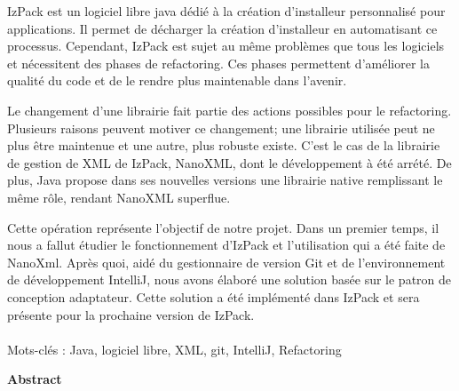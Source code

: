 IzPack est un logiciel libre java dédié à la création d'installeur personnalisé pour applications.
Il permet de décharger la création d'installeur en automatisant ce processus.
Cependant, IzPack est sujet au même problèmes que tous les logiciels et nécessitent des phases de refactoring.
Ces phases permettent d'améliorer la qualité du code et de le rendre plus maintenable dans l'avenir.

Le changement d'une librairie fait partie des actions possibles pour le refactoring.
Plusieurs raisons peuvent motiver ce changement; une librairie utilisée peut ne plus être maintenue et une autre, plus robuste existe.
C'est le cas de la librairie de gestion de XML de IzPack, NanoXML, dont le développement à été arrété. 
De plus, Java propose dans ses nouvelles versions une librairie native remplissant le même rôle, rendant NanoXML superflue.

Cette opération représente l'objectif de notre projet. 
Dans un premier temps, il nous a fallut étudier le fonctionnement d'IzPack et l'utilisation qui a été faite de NanoXml.
Après quoi, aidé du gestionnaire de version Git et de l'environnement de développement IntelliJ, nous avons élaboré une solution basée sur le patron de conception adaptateur.
Cette solution a été implémenté dans IzPack et sera présente pour la prochaine version de IzPack.
~\\
~\\
Mots-clés : Java, logiciel libre, XML, git, IntelliJ, Refactoring
\vfill
\begin{center}\large{\textbf{Abstract}}\end{center}

% 

